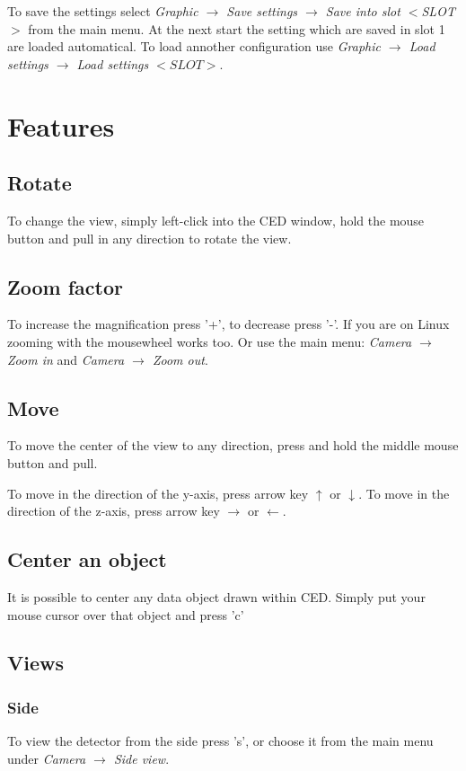 \documentclass[a4paper,10pt]{article}
\begin{document}
To save the settings select 
\textit{Graphic $\to$ Save settings $\to$ Save into slot $<$SLOT$>$} from the main menu. 
At the next start the setting which are saved in slot 1 are loaded automatical. 
To load annother configuration use 
\textit{Graphic $\to$ Load settings $\to$ Load settings $<SLOT>$}.


\section{Features}
\subsection{Rotate}
To change the view, simply left-click into the CED window, hold the mouse button and pull in any direction to rotate the view.
\subsection{Zoom factor}
To increase the magnification press '+', to decrease press '-'. If you are on Linux zooming with the mousewheel works too. 
Or use the main menu: \textit{Camera $\rightarrow$ Zoom in} and \textit{Camera $\rightarrow$ Zoom out}. 

\subsection{Move}
To move the center of the view to any direction, press and hold the middle mouse button and pull. 

To move in the direction of the y-axis, press arrow key $\uparrow$ or $\downarrow$. 
To move in the direction of the z-axis, press arrow key $\to$ or $\leftarrow$. 

\subsection{Center an object}
It is possible to center any data object drawn within CED. Simply put your mouse cursor over that object and press 'c' 

\subsection{Views}
\subsubsection{Side}
To view the detector from the side press 's', or choose it from the main menu under \textit{Camera $\to$ Side view}.
\end{document}
